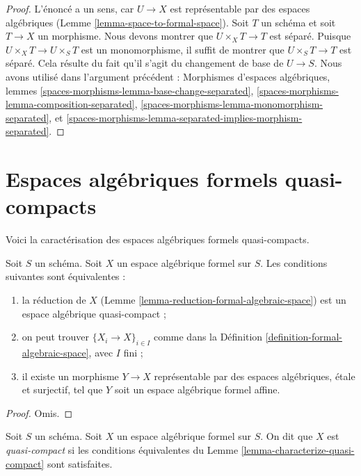 \begin{proof}
L'énoncé a un sens, car $U \to X$ est représentable par des
espaces algébriques (Lemme \ref{lemma-space-to-formal-space}).
Soit $T$ un schéma et soit $T \to X$ un morphisme. Nous devons montrer
que $U \times_X T \to T$ est séparé. Puisque $U \times_X T \to U \times_S T$
est un monomorphisme, il suffit de montrer que $U \times_S T \to T$
est séparé. Cela résulte du fait qu'il s'agit du changement de base de $U \to S$.
Nous avons utilisé dans l'argument précédent :
Morphismes d'espaces algébriques, lemmes
\ref{spaces-morphisms-lemma-base-change-separated},
\ref{spaces-morphisms-lemma-composition-separated},
\ref{spaces-morphisms-lemma-monomorphism-separated}, et
\ref{spaces-morphisms-lemma-separated-implies-morphism-separated}.
\end{proof}




\section{Espaces algébriques formels quasi-compacts}
\label{section-quasi-compact}

\noindent
Voici la caractérisation des espaces algébriques formels
quasi-compacts.

\begin{lemma}
\label{lemma-characterize-quasi-compact}
Soit $S$ un schéma. Soit $X$ un espace algébrique formel sur $S$.
Les conditions suivantes sont équivalentes :
\begin{enumerate}
\item la réduction de $X$
(Lemme \ref{lemma-reduction-formal-algebraic-space}) est un espace
algébrique quasi-compact ;
\item on peut trouver $\{X_i \to X\}_{i \in I}$ comme dans la
Définition \ref{definition-formal-algebraic-space}, avec $I$ fini ;
\item il existe un morphisme $Y \to X$ représentable par des espaces
algébriques, étale et surjectif, tel que
$Y$ soit un espace algébrique formel affine.
\end{enumerate}
\end{lemma}

\begin{proof}
Omis.
\end{proof}

\begin{definition}
\label{definition-quasi-compact}
Soit $S$ un schéma. Soit $X$ un espace algébrique formel sur $S$.
On dit que $X$ est {\it quasi-compact} si les conditions équivalentes du
Lemme \ref{lemma-characterize-quasi-compact} sont satisfaites.
\end{definition}

